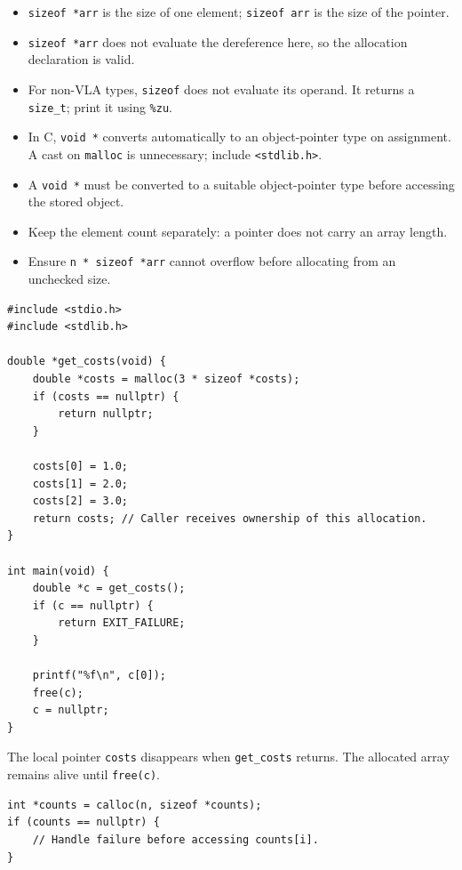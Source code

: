 \documentclass[11pt,a4paper]{article}
\providecommand{\tightlist}{\setlength{\itemsep}{0pt}\setlength{\parskip}{0pt}}
\begin{document}
\begin{itemize}
\tightlist
\item
  \texttt{sizeof\ *arr} is the size of one element; \texttt{sizeof\ arr} is the size of the pointer.
\item
  \texttt{sizeof\ *arr} does not evaluate the dereference here, so the allocation declaration is valid.
\item
  For non-VLA types, \texttt{sizeof} does not evaluate its operand. It returns a \texttt{size\_t}; print it using \texttt{\%zu}.
\item
  In C, \texttt{void\ *} converts automatically to an object-pointer type on assignment. A cast on \texttt{malloc} is unnecessary; include \texttt{\textless{}stdlib.h\textgreater{}}.
\item
  A \texttt{void\ *} must be converted to a suitable object-pointer type before accessing the stored object.
\item
  Keep the element count separately: a pointer does not carry an array length.
\item
  Ensure \texttt{n\ *\ sizeof\ *arr} cannot overflow before allocating from an unchecked size.
\end{itemize}

\label{returning-a-dynamically-allocated-array}
\hypertarget{returning-a-dynamically-allocated-array}{}

\begin{lstlisting}[style=cscode]
#include <stdio.h>
#include <stdlib.h>

double *get_costs(void) {
    double *costs = malloc(3 * sizeof *costs);
    if (costs == nullptr) {
        return nullptr;
    }

    costs[0] = 1.0;
    costs[1] = 2.0;
    costs[2] = 3.0;
    return costs; // Caller receives ownership of this allocation.
}

int main(void) {
    double *c = get_costs();
    if (c == nullptr) {
        return EXIT_FAILURE;
    }

    printf("%f\n", c[0]);
    free(c);
    c = nullptr;
}
\end{lstlisting}

The local pointer \texttt{costs} disappears when \texttt{get\_costs} returns. The allocated array remains alive until \texttt{free(c)}.

\label{calloc}
\hypertarget{calloc}{}

\begin{lstlisting}[style=cscode]
int *counts = calloc(n, sizeof *counts);
if (counts == nullptr) {
    // Handle failure before accessing counts[i].
}
\end{lstlisting}
\end{document}
